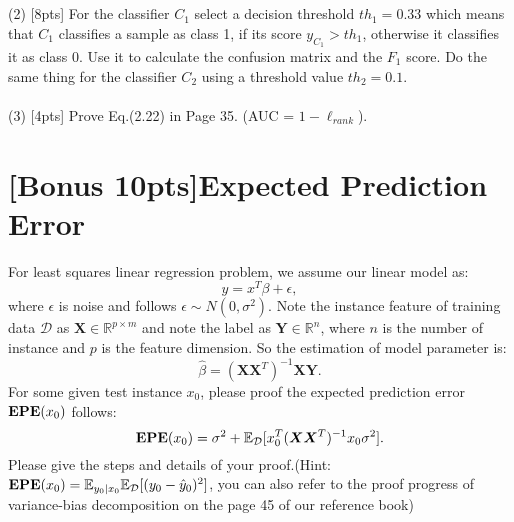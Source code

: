 \documentclass{article}
\begin{document}
	\\\\
	(2) [8pts] For the classifier $C_1$ select a decision threshold $th_1 = 0.33$ which means that $C_1$ classifies a sample as class 1, if its score $y_{C_1} > th_1$, otherwise it classifies it as class 0. Use it to calculate the confusion matrix and the $F_1$ score. Do the same thing for the classifier $C_2$ using a threshold value $th_2 = 0.1$.\\\\
	(3) [4pts] Prove Eq.(2.22) in Page 35. (AUC = $1 - \ell_{rank}$).
	
	\section{[Bonus 10pts]Expected Prediction Error}
	For least squares linear regression problem, we assume our linear model as:\\
	\begin{equation}
	y=x^T \beta+\epsilon,
	\end{equation}
	where $\epsilon$ is noise and follows $\epsilon\sim N(0,\sigma^2)$. Note the instance feature of training data $\mathcal{D}$ as $\bm{X}\in\mathbb{R}^{p\times m}$ and note the label as $\bm{Y}\in\mathbb{R}^n$, where $n$ is the number of instance and $p$ is the feature dimension. So the estimation of model parameter is:\\
	\begin{equation}
	\hat{\beta}=(\bm{XX}^T)^{-1}\bm{XY}.
	\end{equation}
	For some given test instance $x_0$, please proof the expected prediction error $\text{\bf{EPE}}(x_0)$ follows:\\
	\begin{equation}
	\text{\bf{EPE}}(x_0)=\sigma^2+\mathbb{E}_{\mathcal{D}}[x^T_0(\bm{XX}^T)^{-1} x_0\sigma^2].
	\end{equation}
	Please give the steps and details of your proof.(Hint: $\text{\bf{EPE}}(x_0)=\mathbb{E}_{y_0|x_0}\mathbb{E}_{\mathcal{D}}[(y_0-\hat{y}_0)^2]$, you can also refer to the proof progress of variance-bias decomposition on the page 45 of our reference book)
	
	
\end{document}

